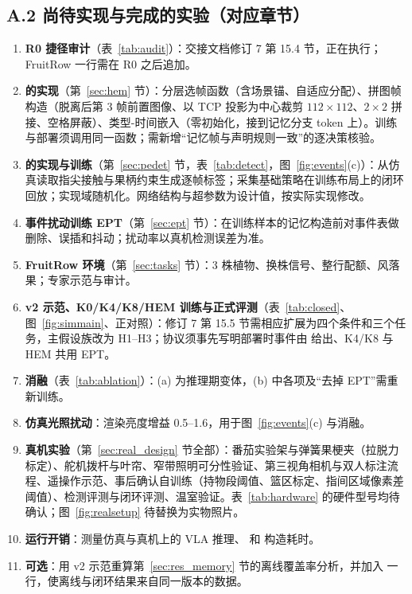 \subsection*{A.2 尚待实现与完成的实验（对应章节）}
\begin{enumerate}
\item \textbf{R0 捷径审计}（表~\ref{tab:audit}）：交接文档修订 7 第 15.4 节，正在执行；FruitRow 一行需在 R0 之后追加。
\item \textbf{\hem{} 的实现}（第~\ref{sec:hem} 节）：分层选帧函数（含场景锚、自适应分配）、拼图帧构造（脱离后第 3 帧前置图像、以 TCP 投影为中心裁剪 $112\times112$、$2\times2$ 拼接、空格屏蔽）、类型-时间嵌入（零初始化，接到记忆分支 token 上）。训练与部署须调用同一函数；需新增“记忆帧与声明规则一致”的逐决策核验。
\item \textbf{\pedet{} 的实现与训练}（第~\ref{sec:pedet} 节，表~\ref{tab:detect}，图~\ref{fig:events}(c)）：从仿真读取指尖接触与果柄约束生成逐帧标签；采集基础策略在训练布局上的闭环回放；实现域随机化。网络结构与超参数为设计值，按实际实现修改。
\item \textbf{事件扰动训练 EPT}（第~\ref{sec:ept} 节）：在训练样本的记忆构造前对事件表做删除、误插和抖动；扰动率以真机检测误差为准。
\item \textbf{FruitRow 环境}（第~\ref{sec:tasks} 节）：3 株植物、换株信号、整行配额、风落果；专家示范与审计。
\item \textbf{v2 示范、K0/K4/K8/HEM 训练与正式评测}（表~\ref{tab:closed}、图~\ref{fig:simmain}、正对照）：修订 7 第 15.5 节需相应扩展为四个条件和三个任务，主假设族改为 H1--H3；协议须事先写明部署时事件由 \pedet{} 给出、K4/K8 与 HEM 共用 EPT。
\item \textbf{消融}（表~\ref{tab:ablation}）：(a) 为推理期变体，(b) 中各项及“去掉 EPT”需重新训练。
\item \textbf{仿真光照扰动}：渲染亮度增益 0.5--1.6，用于图~\ref{fig:events}(c) 与消融。
\item \textbf{真机实验}（第~\ref{sec:real_design} 节全部）：番茄实验架与弹簧果梗夹（拉脱力标定）、舵机拨杆与叶帘、窄带照明可分性验证、第三视角相机与双人标注流程、遥操作示范、事后确认自训练（持物段阈值、篮区标定、指间区域像素差阈值）、检测评测与闭环评测、温室验证。表~\ref{tab:hardware} 的硬件型号均待确认；图~\ref{fig:realsetup} 待替换为实物照片。
\item \textbf{运行开销}：测量仿真与真机上的 VLA 推理、\pedet{} 和 \hem{} 构造耗时。
\item \textbf{可选}：用 v2 示范重算第~\ref{sec:res_memory} 节的离线覆盖率分析，并加入 \hem{} 一行，使离线与闭环结果来自同一版本的数据。
\end{enumerate}

